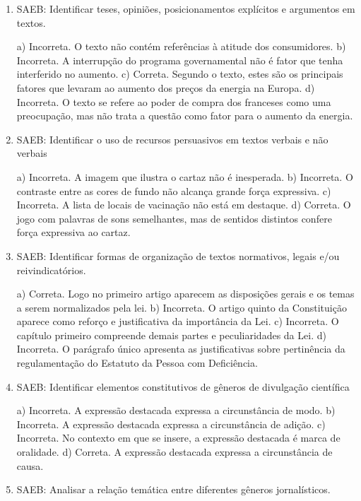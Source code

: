 \begin{enumerate}

	\item
SAEB: Identificar teses, opiniões, posicionamentos explícitos e argumentos em
textos.

a) Incorreta. O texto não contém referências à atitude dos consumidores.
b) Incorreta. A interrupção do programa governamental não é fator que 
tenha interferido no aumento.
c) Correta. Segundo o texto, estes são os principais fatores que levaram
ao aumento dos preços da energia na Europa. 
d) Incorreta. O texto se refere ao poder de compra dos franceses como uma
preocupação, mas não trata a questão como fator para o aumento da energia.

	\item
SAEB: Identificar o uso de recursos persuasivos em textos verbais e não
verbais

a) Incorreta. A imagem que ilustra o cartaz não é inesperada.
b) Incorreta. O contraste entre as cores de fundo não alcança
grande força expressiva.
c) Incorreta. A lista de locais de vacinação não está em destaque.
d) Correta. O jogo com palavras de sons semelhantes, mas de sentidos
distintos confere força expressiva ao cartaz.

	\item
SAEB: Identificar formas de organização de textos normativos, 
legais e/ou reivindicatórios.

a) Correta. Logo no primeiro artigo aparecem as disposições gerais e os
temas a serem normalizados pela lei.
b) Incorreta. O artigo quinto da Constituição aparece como reforço e
justificativa da importância da Lei.
c) Incorreta. O capítulo primeiro compreende demais partes e
peculiaridades da Lei.
d) Incorreta. O parágrafo único apresenta as justificativas sobre
pertinência da regulamentação do Estatuto da Pessoa com Deficiência.

	\item
SAEB: Identificar elementos constitutivos de gêneros de divulgação científica

a) Incorreta. A expressão destacada expressa a circunstância de modo.
b) Incorreta. A expressão destacada expressa a circunstância de adição.
c) Incorreta. No contexto em que se insere, a expressão destacada é marca de oralidade.
d) Correta. A expressão destacada expressa a circunstância de causa.

	\item
SAEB: Analisar a relação temática entre diferentes gêneros jornalísticos.


\end{enumerate}
